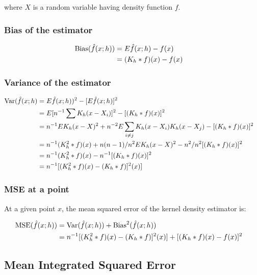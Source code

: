 where $X$ is a random variable having density function $f$.

\subsubsection{Bias of the estimator}

\begin{align}
\mbox{Bias}(\hat{f}(x;h)) & = E \hat{f}(x;h) - f(x) && \nonumber \\
    & = (K_h \ast f)(x) - f(x) &&
\end{align}

\subsubsection{Variance of the estimator}

\begin{align}
\mbox{Var}(\hat{f}(x;h) & = E\hat{f}(x;h))^2 - [E\hat{f}(x;h)]^2 && \nonumber \\
    & = E[n^{-1}\sum{K_h(x - X_i)}]^2 - [(K_h \ast f)(x)]^2 && \nonumber \\
    & = n^{-1} E K_h(x - X)^2 + n^{-2} E \sum_{i \neq j}{K_h(x-X_i)K_h(x-X_j)} - [(K_h \ast f)(x)]^2 && \nonumber \\
    & = n^{-1} (K_h^2 \ast f)(x) + n(n - 1) / n^2 E K_h(x - X)^2 - n^2 / n^2 [(K_h \ast f)(x)]^2 && \nonumber \\
    & = n^{-1} (K_h^2 \ast f)(x) - n^{-1} [(K_h \ast f)(x)]^2 && \nonumber \\
    & = n^{-1} [(K_h^2 \ast f)(x) - (K_h \ast f)]^2(x)]
\end{align}

\subsubsection{MSE at a point}

At a given point $x$, the mean squared error of the kernel density estimator is:

\begin{align}
\mbox{MSE}(\hat{f}(x;h)) & = \mbox{Var}(\hat{f}(x;h)) + \mbox{Bias}^2(\hat{f}(x;h)) && \nonumber \\
    & = n^{-1} [(K_h^2 \ast f)(x) - (K_h \ast f)]^2(x)] + [(K_h \ast f)(x) - f(x)]^2 \label{eq:MSE}
\end{align}

\subsection{Mean Integrated Squared Error}

